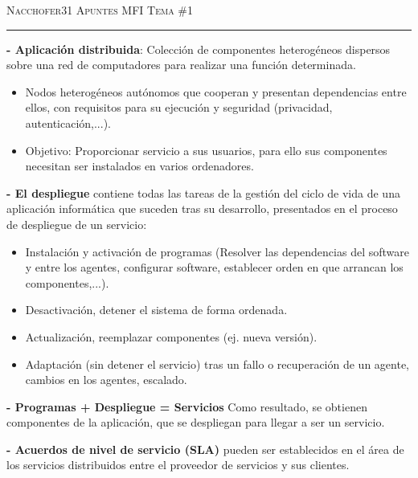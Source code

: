 \documentclass[12pt]{amsart}
\begin{document}
    \thispagestyle{empty}
    {\scshape Nacchofer31} \hfill {\scshape \large Apuntes MFI} \hfill {\scshape Tema \#1}
     
    \hrule
    \medskip
    
    \textbf{- Aplicación distribuida}: Colección de 
    componentes heterogéneos dispersos sobre una red de 
    computadores para realizar una función determinada.
    
    \begin{itemize}
    
    \item  Nodos heterogéneos autónomos que cooperan y presentan dependencias entre ellos, con requisitos para su ejecución y seguridad (privacidad, autenticación,...).
    \item  Objetivo: Proporcionar servicio a sus usuarios, para ello sus componentes necesitan ser instalados en varios ordenadores.
    
    \end{itemize}
    
    \textbf{- El despliegue} contiene todas las tareas de la gestión del ciclo de vida de una aplicación 
    informática que suceden tras su desarrollo, presentados en el proceso de despliegue de un servicio:
       
    
    \begin{itemize}
    
    \item  Instalación y activación de programas (Resolver 
    las dependencias del 
    software y entre los agentes, configurar software, establecer orden en que arrancan los componentes,...).
    \item  Desactivación, detener el sistema de forma ordenada.
    \item  Actualización, reemplazar componentes (ej. nueva versión). 
    \item  Adaptación (sin detener el servicio) tras un fallo o recuperación de un agente, cambios en los agentes, escalado.
    
    \end{itemize}
    
    \textbf{- Programas + Despliegue = Servicios} Como resultado, se obtienen componentes de la 
    aplicación, que se despliegan para llegar a ser un servicio.
    
    \smallskip
    
    \textbf{- Acuerdos de nivel de servicio (SLA)} pueden ser establecidos en el área de los servicios distribuidos entre el proveedor de servicios y sus clientes.
    
\end{document}
